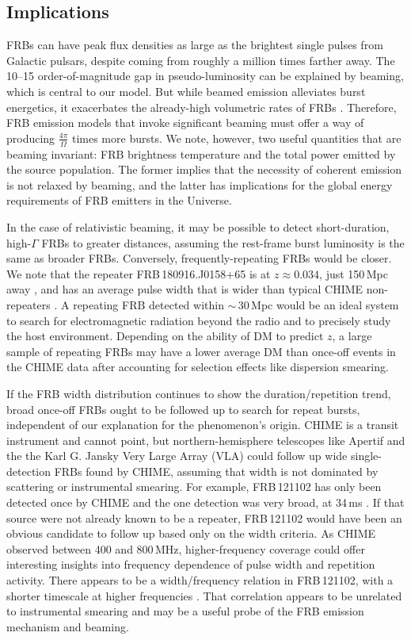 \documentclass[fleqn,usenatbib]{mnras}
\begin{document}
\subsection{Implications}
FRBs can have peak flux densities as large as the brightest
single pulses from Galactic pulsars, despite coming from 
roughly a million times farther away. The 10--15 
order-of-magnitude gap in pseudo-luminosity can be explained 
by beaming, which is central to our model. But while 
beamed emission alleviates burst energetics, it exacerbates 
the already-high volumetric rates of FRBs \citep{Nicholl-2017, ravi-2019-repeaters}. Therefore, 
FRB emission models that invoke significant beaming 
must offer a way of producing $\frac{4\pi}{\Omega}$ 
times more bursts. We note, however, two useful quantities that are beaming 
invariant: FRB brightness temperature and the total power 
emitted by the source population. The former implies that 
the necessity of coherent emission is not relaxed by beaming, 
and the latter has implications for the global energy requirements
of FRB emitters in the Universe.

In the case of relativistic beaming, it may be possible to 
detect short-duration, high-$\Gamma$ FRBs to greater distances, 
assuming the rest-frame burst luminosity is the same as broader FRBs. Conversely, frequently-repeating FRBs would be closer.
We note that the repeater FRB\,180916.J0158+65 is at $z\approx 0.034$, 
just 150\,Mpc away \citep{marcote20}, 
and has an average pulse width that is wider than 
typical CHIME non-repeaters \citep{chime19-8repeaters}. 
A repeating FRB 
detected within $\sim$\,30\,Mpc would be an ideal system to 
search for electromagnetic radiation beyond the radio and to
precisely study the host environment.
Depending on the ability of DM to predict $z$, 
a large sample of repeating 
FRBs may have a lower average DM than once-off events in 
the CHIME data after accounting for selection effects 
like dispersion smearing. 

If the FRB width distribution continues to show the duration/repetition trend, 
broad once-off FRBs ought to be followed up to search for repeat bursts, independent 
of our explanation for the phenomenon's origin.
CHIME is a transit instrument and cannot point, but northern-hemisphere telescopes 
like Apertif \citep{artsso20} and the the Karl G. Jansky Very 
Large Array (VLA) \citep{law-2018} could 
follow up wide single-detection FRBs found by CHIME, assuming that 
width is not dominated by scattering or instrumental smearing. 
For example, 
FRB\,121102 has only been detected once by CHIME and 
the one detection was 
very broad, at 34\,ms \citep{josephy-2019}. If that source were not already known to be a repeater, FRB\,121102 
would have been an obvious candidate to follow up based only on the width criteria.
As CHIME observed 
between 400 and 800\,MHz, higher-frequency coverage 
could offer interesting insights into frequency dependence 
of pulse width and 
repetition activity.
There appears to be a width/frequency relation in 
FRB\,121102, with a shorter timescale at higher 
frequencies \citep{Gajjar2018}.
That correlation appears to be unrelated to 
instrumental smearing and may 
be a useful probe of the FRB emission 
mechanism and beaming.
\end{document}
